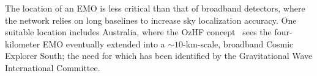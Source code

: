 \documentclass[prx,superscriptaddress,twocolumn,nopreprintnumbers,floatfix,nofootinbib]{revtex4}
\begin{document}
The location of an EMO is less critical than that of broadband detectors, where the network relies on long baselines to increase sky localization accuracy.  One suitable location includes Australia, where the OzHF concept~\cite{bailes19} sees the four-kilometer EMO eventually extended into a $\sim10$-km-scale, broadband Cosmic Explorer South; the need for which has been identified by the Gravitational Wave International Committee.


\end{document}
